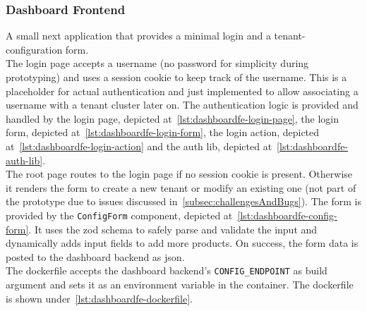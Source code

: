 \documentclass[11pt, a4paper, oneside, listof=totoc]{scrartcl}
\begin{document}
            \subsubsection{Dashboard Frontend}\label{subsubsec:dashboardFrontend}
                A small \gls{next} application that provides a minimal login and a tenant-configuration
                form.\\
                The login page accepts a username (no password for simplicity during prototyping)
                and uses a session cookie to keep track of the username.
                This is a placeholder for actual authentication and just implemented to allow
                associating a username with a tenant cluster later on.
                The authentication logic is provided and handled by the login page, depicted
                at~\autoref{lst:dashboardfe-login-page}, the login form, depicted
                at~\autoref{lst:dashboardfe-login-form}, the login action, depicted
                at~\autoref{lst:dashboardfe-login-action} and the auth lib, depicted
                at~\autoref{lst:dashboardfe-auth-lib}.\\
                The root page routes to the login page if no session cookie is present.
                Otherwise it renders the form to create a new tenant or modify an existing one
                (not part of the prototype due to issues discussed
                in~\autoref{subsec:challengesAndBugs}).
                The form is provided by the \texttt{ConfigForm} component, depicted
                at~\autoref{lst:dashboardfe-config-form}.
                It uses the zod schema to safely parse and validate the input and dynamically
                adds input fields to add more products.
                On success, the form data is posted to the dashboard backend as \gls{json}.\\
                The dockerfile accepts the dashboard backend's \texttt{CONFIG\_ENDPOINT} as build
                argument and sets it as an environment variable in the container.
                The dockerfile is shown under~\autoref{lst:dashboardfe-dockerfile}.
\end{document}
